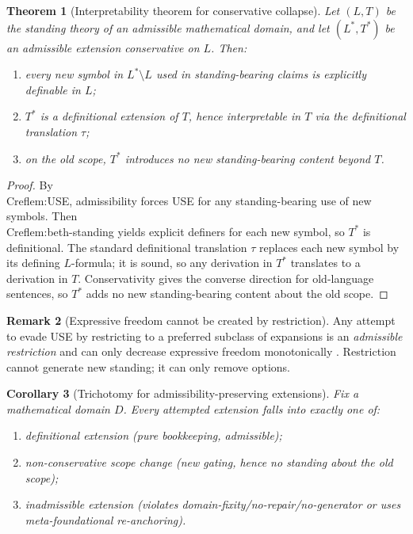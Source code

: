 \documentclass[11pt]{article}
\newtheorem{theorem}{Theorem}[section]
\newtheorem{corollary}[theorem]{Corollary}
\theoremstyle{definition}
\newtheorem{remark}[theorem]{Remark}
\begin{document}
\begin{theorem}[Interpretability theorem for conservative collapse]
\label{thm:interpretability-collapse}
Let $(L,T)$ be the standing theory of an admissible mathematical domain, and let $(L^*,T^*)$ be an admissible extension conservative on $L$.
Then:
\begin{enumerate}[label=\textbf{(I\arabic*)}, leftmargin=2.6em]
\item every new symbol in $L^*\setminus L$ used in standing-bearing claims is explicitly definable in $L$;
\item $T^*$ is a definitional extension of $T$, hence interpretable in $T$ via the definitional translation $\tau$;
\item on the old scope, $T^*$ introduces no new standing-bearing content beyond $T$.
\end{enumerate}
\end{theorem}

\begin{proof}
By \\Cref{lem:USE}, admissibility forces USE for any standing-bearing use of new symbols.
Then \\Cref{lem:beth-standing} yields explicit definers for each new symbol, so $T^*$ is definitional.
The standard definitional translation $\tau$ replaces each new symbol by its defining $L$-formula; it is sound, so any derivation in $T^*$
translates to a derivation in $T$.
Conservativity gives the converse direction for old-language sentences, so $T^*$ adds no new standing-bearing content about the old scope.
\end{proof}

\begin{remark}[Expressive freedom cannot be created by restriction]
Any attempt to evade USE by restricting to a preferred subclass of expansions is an \emph{admissible restriction} and can only
decrease expressive freedom monotonically \cite{MaleyRichnessCollapse2026}.  Restriction cannot generate new standing; it can only remove options.
\end{remark}


\begin{corollary}[Trichotomy for admissibility-preserving extensions]
\label{cor:extension-exhaustion}
Fix a mathematical domain $D$.
Every attempted extension falls into exactly one of:
\begin{enumerate}[label=\textbf{(X\arabic*)}, leftmargin=2.6em]
\item \emph{definitional extension} (pure bookkeeping, admissible);
\item \emph{non-conservative scope change} (new gating, hence no standing about the old scope);
\item \emph{inadmissible extension} (violates domain-fixity/no-repair/no-generator or uses meta-foundational re-anchoring).
\end{enumerate}
\end{corollary}
\end{document}
